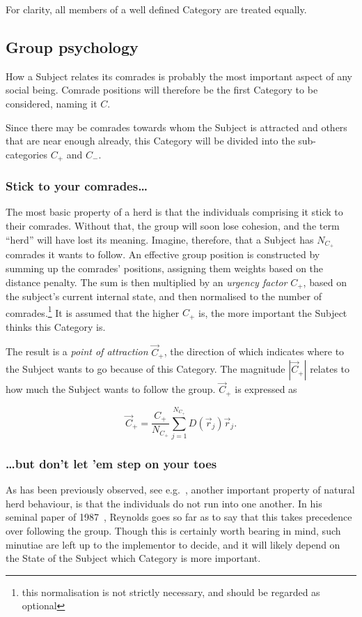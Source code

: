 \documentclass[]{article} %
\begin{document}
For clarity, all members of a well defined Category are treated equally.


\subsection{Group psychology}
\label{sec:good_comrades}
How a Subject relates its comrades is probably the most important aspect of any social being.
Comrade positions will therefore be the first Category to be considered, naming it $C$.

Since there may be comrades towards whom the Subject is attracted and others that are near enough already, this Category will be divided into the sub-categories $C_+$ and $C_-$.


\subsubsection{Stick to your comrades\ldots}
\label{sec:bad_comrades}
The most basic property of a herd is that the individuals comprising it stick to their comrades.
Without that, the group will soon lose cohesion, and the term ``herd'' will have lost its meaning.
Imagine, therefore, that a Subject has $N_{C_+}$ comrades it wants to follow.
An effective group position is constructed by summing up the comrades' positions, assigning them weights based on the distance penalty.
The sum is then multiplied by an \emph{urgency factor} $C_+$, based on the subject's current internal state, and then normalised to the number of comrades.\footnote{this normalisation is not strictly necessary, and should be regarded as optional} 
It is assumed that the higher $C_+$ is, the more important the Subject thinks this Category is.

The result is a \emph{point of attraction} $\vec{C}_+$, the direction of which indicates where to the Subject wants to go because of this Category.
The magnitude $|\vec{C}_+|$ relates to how much the Subject wants to follow the group.
$\vec{C}_+$ is expressed as

\begin{equation}
 \label{eq:good_comrades}
 \vec{C}_+ = \frac{C_+}{N_{C_+}} \sum_{j=1}^{N_{C_+}} D(\vec{r}_j) \vec{r}_j.
\end{equation}


\subsubsection{\ldots but don't let 'em step on your toes}
As has been previously observed, see e.g.~\cite{Reynolds1987, Chiang2009}, another important property of natural herd behaviour, is that the individuals do not run into one another.
In his seminal paper of 1987~\cite{Reynolds1987}, Reynolds goes so far as to say that this takes precedence over following the group.
Though this is certainly worth bearing in mind, such minutiae are left up to the implementor to decide, and it will likely depend on the State of the Subject which Category is more important.
\end{document}
